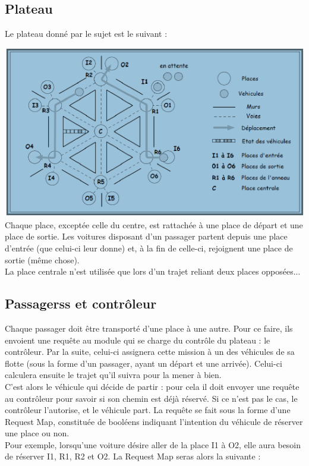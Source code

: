 \documentclass[a4paper, titlepage]{report}
\begin{document}
\subsection{Plateau}
Le plateau donné par le sujet est le suivant :
\vspace{0.5cm}

\includegraphics[]{Images/Plateau}
\vspace{0.5cm}
\\
Chaque place, exceptée celle du centre, est rattachée à une place de départ et une place de sortie. Les voitures disposant d'un passager partent depuis une place d'entrée (que celui-ci leur donne) et, à la fin de celle-ci, rejoignent une place de sortie (même chose).\\
La place centrale n'est utilisée que lors d'un trajet reliant deux places opposées...
\subsection{Passagerss et contrôleur}
Chaque passager doit être transporté d'une place à une autre. Pour ce faire, ils envoient une requête au module qui se charge du contrôle du plateau : le contrôleur. Par la suite, celui-ci assignera cette mission à un des véhicules de sa flotte (sous la forme d'un passager, ayant un départ et une arrivée). Celui-ci calculera ensuite le trajet qu'il suivra pour la mener à bien.\\
C'est alors le véhicule qui décide de partir : pour cela il doit envoyer une requête au contrôleur pour savoir si son chemin est déjà réservé. Si ce n'est pas le cas, le contrôleur l'autorise, et le véhicule part. La requête se fait sous la forme d'une Request Map, constituée de booléens indiquant l'intention du véhicule de réserver une place ou non.\\
Pour exemple, lorsqu'une voiture désire aller de la place I1 à O2, elle aura besoin de réserver I1, R1, R2 et O2. La Request Map seras alors la suivante :
\vspace{0.5cm}
\end{document}
